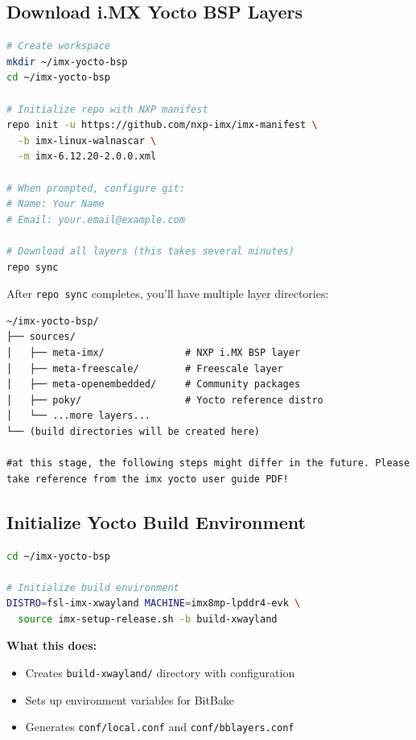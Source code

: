 \documentclass[12pt,a4paper]{report}
\begin{document}
\pagebreak
\subsection{Download i.MX Yocto BSP Layers}

\begin{lstlisting}[language=bash]
# Create workspace
mkdir ~/imx-yocto-bsp
cd ~/imx-yocto-bsp

# Initialize repo with NXP manifest
repo init -u https://github.com/nxp-imx/imx-manifest \
  -b imx-linux-walnascar \
  -m imx-6.12.20-2.0.0.xml

# When prompted, configure git:
# Name: Your Name
# Email: your.email@example.com

# Download all layers (this takes several minutes)
repo sync
\end{lstlisting}

After \texttt{repo sync} completes, you'll have multiple layer directories:

\begin{lstlisting}
~/imx-yocto-bsp/
├── sources/
│   ├── meta-imx/              # NXP i.MX BSP layer
│   ├── meta-freescale/        # Freescale layer
│   ├── meta-openembedded/     # Community packages
│   ├── poky/                  # Yocto reference distro
│   └── ...more layers...
└── (build directories will be created here)

#at this stage, the following steps might differ in the future. Please take reference from the imx yocto user guide PDF!
\end{lstlisting}

\subsection{Initialize Yocto Build Environment}

\begin{lstlisting}[language=bash]
cd ~/imx-yocto-bsp

# Initialize build environment
DISTRO=fsl-imx-xwayland MACHINE=imx8mp-lpddr4-evk \
  source imx-setup-release.sh -b build-xwayland
\end{lstlisting}

\textbf{What this does:}
\begin{itemize}
    \item Creates \texttt{build-xwayland/} directory with configuration
    \item Sets up environment variables for BitBake
    \item Generates \texttt{conf/local.conf} and \texttt{conf/bblayers.conf}
\end{itemize}
\end{document}
